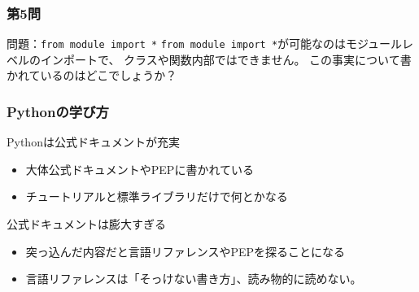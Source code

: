 \documentclass[aspectratio=169,dvipdfmx,12pt,notheorems]{beamer}
\theoremstyle{definition}
\begin{document}
\begin{frame}\frametitle{第5問}

\begin{block}{問題：\texttt{from module import *}}
\texttt{from module import *}が可能なのはモジュールレベルのインポートで、
クラスや関数内部ではできません。
この事実について書かれているのはどこでしょうか？
\end{block}


\end{frame}

\begin{frame}\frametitle{Pythonの学び方}

\begin{block}{Pythonは公式ドキュメントが充実}
\begin{itemize}
\item 大体公式ドキュメントやPEPに書かれている
\item チュートリアルと標準ライブラリだけで何とかなる
\end{itemize}
\end{block}

\begin{alertblock}{公式ドキュメントは膨大すぎる}
\begin{itemize}
\item 突っ込んだ内容だと言語リファレンスやPEPを探ることになる
\item 言語リファレンスは「そっけない書き方」、読み物的に読めない。
\end{itemize}
\end{alertblock}

\end{frame}
\end{document}
